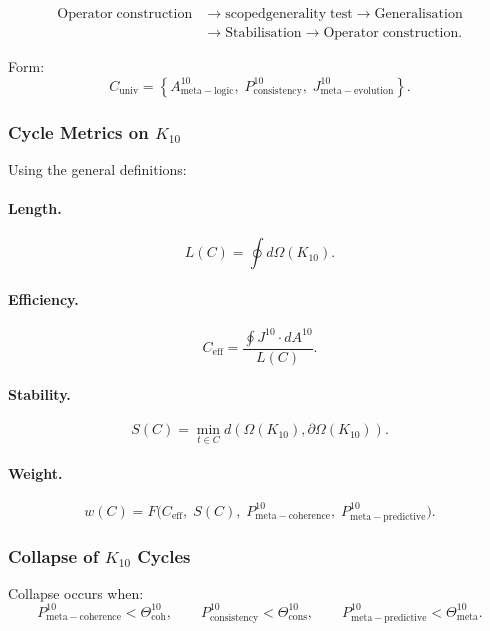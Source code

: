 \[
  \begin{aligned}
  \mathrm{Operator\;construction}
  &\to \mathrm{scoped generality\;test}
  \to \mathrm{Generalisation}\\
  &\to \mathrm{Stabilisation}
  \to \mathrm{Operator\;construction}.
  \end{aligned}
\]

Form:
\[
  C_{\mathrm{univ}}
  =
  \left\{
    A^{10}_{\mathrm{meta\!-\!logic}},\;
    P^{10}_{\mathrm{consistency}},\;
    J^{10}_{\mathrm{meta\!-\!evolution}}
  \right\}.
\]


\subsubsection{Cycle Metrics on $K_{10}$}

Using the general definitions:

\paragraph{Length.}
\[
  L(C) = \oint d\Omega(K_{10}).
\]

\paragraph{Efficiency.}
\[
  C_{\mathrm{eff}} =
  \frac{\oint J^{10}\cdot dA^{10}}{L(C)}.
\]

\paragraph{Stability.}
\[
  S(C) 
   = \min_{t\in C}
     d(\Omega(K_{10}), \partial\Omega(K_{10})).
\]

\paragraph{Weight.}
\[
  w(C)
    = F\big(
        C_{\mathrm{eff}},\;
        S(C),\;
        P^{10}_{\mathrm{meta\!-\!coherence}},\;
        P^{10}_{\mathrm{meta\!-\!predictive}}
      \big).
\]


\subsubsection{Collapse of $K_{10}$ Cycles}

Collapse occurs when:
\[
  P^{10}_{\mathrm{meta\!-\!coherence}} < \Theta^{10}_{\mathrm{coh}},\qquad
  P^{10}_{\mathrm{consistency}} < \Theta^{10}_{\mathrm{cons}},\qquad
  P^{10}_{\mathrm{meta\!-\!predictive}} < \Theta^{10}_{\mathrm{meta}}.
\]

